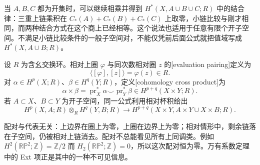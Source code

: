 当 \(A,B,C\) 都为开集时，可以继续相乘并得到 \(H^*(X,A\cup B\cup C;R)\) 中的结合律：三重上链乘积在 \(C_*(A)+C_*(B)+C_*(C)\) 上取零，小链比较与刚才相同，而两种结合方式在这个商上已经相等。这个说法也适用于任意有限个开子空间。不满足小链比较条件的一般子空间对，不能仅凭前后面公式就把值域写成 \(H^*(X,A\cup B;R)\)。

\begin{definition}\label{g2:def:kronecker-cross-cohomology}
	设 \(R\) 为含幺交换环。相对上圈 \(\varphi\) 与同次数相对圈 \(z\) 的[evaluation pairing]定义为
	\[
		\langle[\varphi],[z]\rangle=\varphi(z)\in R.
	\]
	对 \(\alpha\in H^p(X;R)\)、\(\beta\in H^q(Y;R)\)，定义[cohomology cross product]为
	\[
		\alpha\times\beta
		=\operatorname{pr}_X^*\alpha\smile\operatorname{pr}_Y^*\beta
		\in H^{p+q}(X\times Y;R).
	\]
	若 \(A\subset X\)、\(B\subset Y\) 为开子空间，同一公式利用相对杯积给出
	\[
		H^p(X,A;R)\otimes_R H^q(Y,B;R)
		\longrightarrow
		H^{p+q}(X\times Y,A\times Y\cup X\times B;R).
	\]
\end{definition}

配对与代表无关：上边界在圈上为零，上圈在边界上为零；相对情形中，剩余链落在子空间，仍被相对上链消去。配对不总能看见所有上同调类。例如 \(H^2(\mathbb{RP}^2;\mathbb Z)=\mathbb Z/2\) 而 \(H_2(\mathbb{RP}^2;\mathbb Z)=0\)，所以这次配对恒为零。万有系数定理中的 Ext 项正是其中的一种不可见信息。

